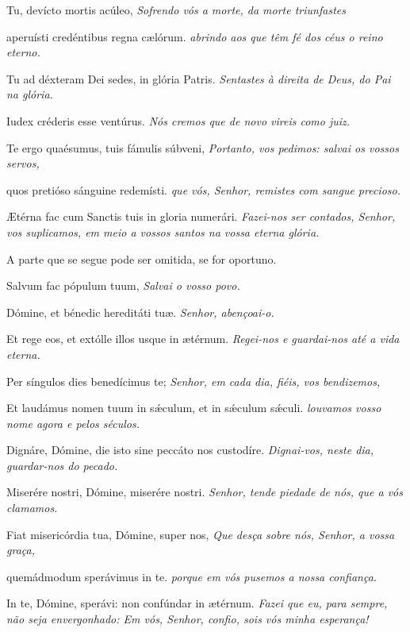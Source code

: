 \begin{paracol}{2}
  Tu, devícto mortis acúleo,
  \switchcolumn
  \emph{Sofrendo vós a morte, da morte triunfastes}
  \switchcolumn*

  aperuísti credéntibus regna cælórum.
  \switchcolumn
  \emph{abrindo aos que têm fé dos céus o reino eterno.}
  \switchcolumn*

  Tu ad déxteram Dei sedes, in glória Patris.
  \switchcolumn
  \emph{Sentastes à direita de Deus, do Pai na glória.}
  \switchcolumn*

  Iudex créderis esse ventúrus.
  \switchcolumn
  \emph{Nós cremos que de novo vireis como juiz.}
  \switchcolumn*

  Te ergo quaésumus, tuis fámulis súbveni,
  \switchcolumn
  \emph{Portanto, vos pedimos: salvai os vossos servos,}
  \switchcolumn*

  quos pretióso sánguine redemísti.
  \switchcolumn
  \emph{que vós, Senhor, remistes com sangue precioso.}
  \switchcolumn*

  {\AE}térna fac cum Sanctis tuis in gloria numerári.
  \switchcolumn
  \emph{Fazei-nos ser contados, Senhor, vos suplicamos,
    em meio a vossos santos na vossa eterna glória.}
\end{paracol}

\begin{rubrica}
  A parte que se segue pode ser omitida, se for oportuno.
\end{rubrica}

\begin{paracol}{2}
  Salvum fac pópulum tuum,
  \switchcolumn
  \emph{Salvai o vosso povo.}
  \switchcolumn*

  Dómine, et bénedic hereditáti tuæ.
  \switchcolumn
  \emph{Senhor, abençoai-o.}
  \switchcolumn*

  Et rege eos, et extólle illos usque in ætérnum.
  \switchcolumn
  \emph{Regei-nos e guardai-nos até a vida eterna.}
  \switchcolumn*

  Per síngulos dies benedícimus te;
  \switchcolumn
  \emph{Senhor, em cada dia, fiéis, vos bendizemos,}
  \switchcolumn*

  Et laudámus nomen tuum in s\'{\ae}culum, et in s\'{\ae}culum s\'{\ae}culi.
  \switchcolumn
  \emph{louvamos vosso nome agora e pelos séculos.}
  \switchcolumn*

  Dignáre, Dómine, die isto sine peccáto nos custodíre.
  \switchcolumn
  \emph{Dignai-vos, neste dia, guardar-nos do pecado.}
  \switchcolumn*

  Miserére nostri, Dómine, miserére nostri.
  \switchcolumn
  \emph{Senhor, tende piedade de nós, que a vós clamamos.}
  \switchcolumn*

  Fiat misericórdia tua, Dómine, super nos,
  \switchcolumn
  \emph{Que desça sobre nós, Senhor, a vossa graça,}
  \switchcolumn*

  quemádmodum sperávimus in te.
  \switchcolumn
  \emph{porque em vós pusemos a nossa confiança.}
  \switchcolumn*

  In te, Dómine, sperávi:
  non confúndar in ætérnum.
  \switchcolumn
  \emph{Fazei que eu, para sempre, não seja envergonhado:
    Em vós, Senhor, confio, sois vós minha esperança!}
\end{paracol}